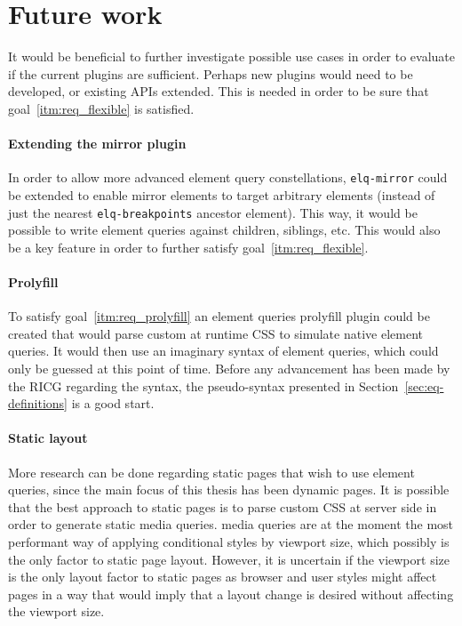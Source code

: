 \documentclass[a4paper,11pt]{kth-mag}
\newcommand{\code}[1]{\texttt{#1}}
\begin{document}
    \section{Future work}
      It would be beneficial to further investigate possible use cases in order to evaluate if the current plugins are sufficient.
      Perhaps new plugins would need to be developed, or existing \glspl{API} extended.
      This is needed in order to be sure that goal~\ref{itm:req_flexible} is satisfied.

      \paragraph{Extending the mirror plugin}
      In order to allow more advanced element query constellations, \code{elq-mirror} could be extended to enable mirror \glspl{element} to target arbitrary \glspl{element} (instead of just the nearest \code{elq-breakpoints} ancestor \gls{element}).
      This way, it would be possible to write element queries against children, siblings, etc.
      This would also be a key feature in order to further satisfy goal~\ref{itm:req_flexible}.

      \paragraph{Prolyfill}
      To satisfy goal~\ref{itm:req_prolyfill} an element queries prolyfill plugin could be created that would parse custom at runtime \gls{CSS} to simulate \gls{native} element queries.
      It would then use an imaginary syntax of element queries, which could only be guessed at this point of time.
      Before any advancement has been made by the RICG regarding the syntax, the pseudo-syntax presented in Section~\ref{sec:eq-definitions} is a good start.

      \paragraph{Static layout}
      More research can be done regarding static pages that wish to use element queries, since the main focus of this thesis has been dynamic pages.
      It is possible that the best approach to static pages is to parse custom \gls{CSS} at server side in order to generate static \gls{media queries}.
      \Gls{media queries} are at the moment the most performant way of applying conditional styles by \gls{viewport} size, which possibly is the only factor to static page layout.
      However, it is uncertain if the \gls{viewport} size is the only layout factor to static pages as \gls{browser} and user styles might affect pages in a way that would imply that a layout change is desired without affecting the \gls{viewport} size.
\end{document}
